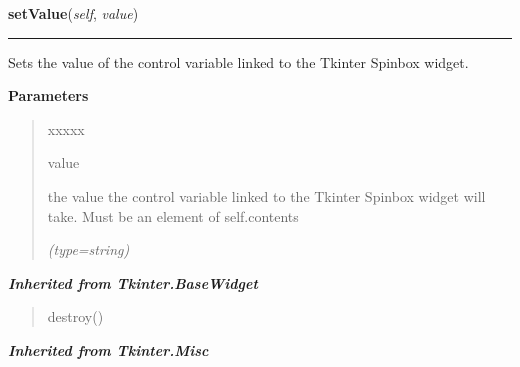 \hspace{.8\funcindent}\begin{boxedminipage}{\funcwidth}

    \raggedright \textbf{setValue}(\textit{self}, \textit{value})

    \vspace{-1.5ex}

    \rule{\textwidth}{0.5\fboxrule}
\setlength{\parskip}{2ex}
    Sets the value of the control variable linked to the Tkinter Spinbox 
    widget.

\setlength{\parskip}{1ex}
      \textbf{Parameters}
      \vspace{-1ex}

      \begin{quote}
        \begin{Ventry}{xxxxx}

          \item[value]

          the value the control variable linked to the Tkinter Spinbox 
          widget will take. Must be an element of 
          {\textbar}self.contents{\textbar}

            {\it (type=string)}

        \end{Ventry}

      \end{quote}

    \end{boxedminipage}


\large{\textbf{\textit{Inherited from Tkinter.BaseWidget}}}

\begin{quote}
destroy()
\end{quote}

\large{\textbf{\textit{Inherited from Tkinter.Misc}}}

